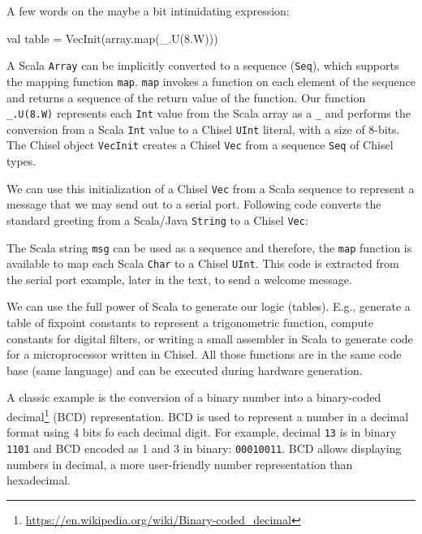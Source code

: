 \documentclass[%
    10pt,
    headinclude, footexclude,
    openright, %
    notitlepage,
    cleardoubleempty,
    headsepline,
    pointlessnumbers,
    bibtotoc, idxtotoc,
    ]{scrbook}
\newcommand{\code}[1]{{\small{\texttt{#1}}}}
\newcommand{\myref}[2]{\href{#1}{#2}}
\renewcommand{\myref}[2]{{#2}{\footnote{\url{#1}}}}
\begin{document}



A few words on the maybe a bit intimidating expression:
\begin{chisel}
  val table = VecInit(array.map(_.U(8.W)))
\end{chisel}

\noindent A Scala \code{Array} can be implicitly converted to a sequence (\code{Seq}),
which supports the mapping function \code{map}.
\code{map} invokes a function on each element of the sequence and returns
a sequence of the return value of the function. Our function \code{\_.U(8.W)} represents
each \code{Int} value from the Scala array as a \code{\_} and performs the conversion
from a Scala \code{Int} value to a Chisel \code{UInt} literal, with a size of 8-bits.
The Chisel object \code{VecInit} creates a Chisel \code{Vec} from a sequence \code{Seq}
of Chisel types.

We can use this initialization of a Chisel \code{Vec} from a Scala sequence to represent
a message that we may send out to a serial port. Following code converts the standard greeting
from a Scala/Java \code{String} to a Chisel \code{Vec}:


\noindent The Scala string \code{msg} can be used as a sequence and therefore, the \code{map}
function is available to map each Scala \code{Char} to a Chisel \code{UInt}.
This code is extracted from the serial port example, later in the text, to send a welcome
message. 


We can use the full power of Scala to generate our logic (tables).
E.g., generate a table of fixpoint constants to represent a trigonometric function,
compute constants for digital filters, or writing a small assembler in Scala
to generate code for a microprocessor written in Chisel. All those functions
are in the same code base (same language) and can be executed during
hardware generation.

A classic example is the conversion of a binary number
into a \myref{https://en.wikipedia.org/wiki/Binary-coded_decimal}{binary-coded decimal}
(BCD) representation. BCD is used to represent a number in a decimal
format using 4 bits fo each decimal digit. For example, decimal \code{13} is in binary
\code{1101} and BCD encoded as 1 and 3 in binary: \code{00010011}.
BCD allows displaying numbers in decimal, a more user-friendly number
representation than hexadecimal.
\end{document}
